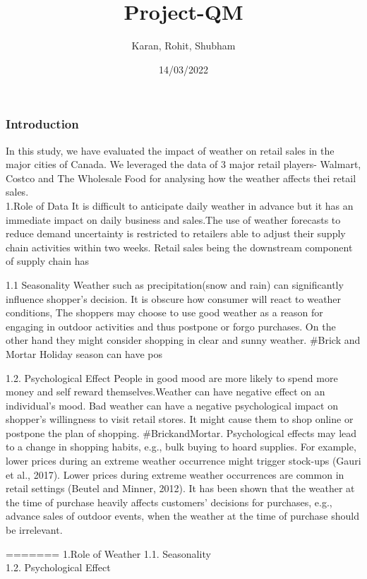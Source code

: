 \documentclass[
]{article}
\title{Project-QM}
\author{Karan, Rohit, Shubham}
\date{14/03/2022}
\begin{document}
\maketitle

\hypertarget{introduction}{%
\subsubsection{Introduction}\label{introduction}}

In this study, we have evaluated the impact of weather on retail sales
in the major cities of Canada. We leveraged the data of 3 major retail
players- Walmart, Costco and The Wholesale Food for analysing how the
weather affects thei retail sales.\\
1.Role of Data It is difficult to anticipate daily weather in advance
but it has an immediate impact on daily business and sales.The use of
weather forecasts to reduce demand uncertainty is restricted to
retailers able to adjust their supply chain activities within two weeks.
Retail sales being the downstream component of supply chain has

1.1 Seasonality Weather such as precipitation(snow and rain) can
significantly influence shopper's decision. It is obscure how consumer
will react to weather conditions, The shoppers may choose to use good
weather as a reason for engaging in outdoor activities and thus postpone
or forgo purchases. On the other hand they might consider shopping in
clear and sunny weather. \#Brick and Mortar Holiday season can have pos

1.2. Psychological Effect People in good mood are more likely to spend
more money and self reward themselves.Weather can have negative effect
on an individual's mood. Bad weather can have a negative psychological
impact on shopper's willingness to visit retail stores. It might cause
them to shop online or postpone the plan of shopping. \#BrickandMortar.
Psychological effects may lead to a change in shopping habits, e.g.,
bulk buying to hoard supplies. For example, lower prices during an
extreme weather occurrence might trigger stock-ups (Gauri et al., 2017).
Lower prices during extreme weather occurrences are common in retail
settings (Beutel and Minner, 2012). It has been shown that the weather
at the time of purchase heavily affects customers' decisions for
purchases, e.g., advance sales of outdoor events, when the weather at
the time of purchase should be irrelevant.

======= 1.Role of Weather 1.1. Seasonality\\
1.2. Psychological Effect
\end{document}
